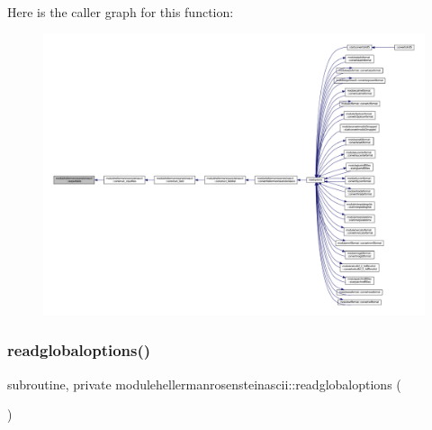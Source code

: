 Here is the caller graph for this function\+:\nopagebreak
\begin{figure}[H]
\begin{center}
\leavevmode
\includegraphics[width=350pt]{namespacemodulehellermanrosensteinascii_ab76e43d5b0134daf9106f606a088cbea_icgraph}
\end{center}
\end{figure}
\mbox{\label{namespacemodulehellermanrosensteinascii_af439206d121534b62861ec79a514b301}} 
\subsubsection{\texorpdfstring{readglobaloptions()}{readglobaloptions()}}
{\footnotesize\ttfamily subroutine, private modulehellermanrosensteinascii\+::readglobaloptions (\begin{DoxyParamCaption}{ }\end{DoxyParamCaption})\hspace{0.3cm}{\ttfamily [private]}}

